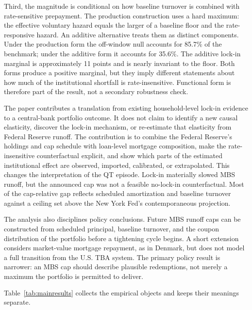 Third, the magnitude is conditional on how baseline turnover is combined with rate-sensitive prepayment. The production construction uses a hard maximum: the effective voluntary hazard equals the larger of a baseline floor and the rate-responsive hazard. An additive alternative treats them as distinct components. Under the production form the off-window null accounts for 85.7\% of the benchmark; under the additive form it accounts for 35.6\%. The additive lock-in marginal is approximately 11 points and is nearly invariant to the floor. Both forms produce a positive marginal, but they imply different statements about how much of the institutional shortfall is rate-insensitive. Functional form is therefore part of the result, not a secondary robustness check.

The paper contributes a translation from existing household-level lock-in evidence to a central-bank portfolio outcome. It does not claim to identify a new causal elasticity, discover the lock-in mechanism, or re-estimate that elasticity from Federal Reserve runoff. The contribution is to combine the Federal Reserve's holdings and cap schedule with loan-level mortgage composition, make the rate-insensitive counterfactual explicit, and show which parts of the estimated institutional effect are observed, imported, calibrated, or extrapolated. This changes the interpretation of the QT episode. Lock-in materially slowed MBS runoff, but the announced cap was not a feasible no-lock-in counterfactual. Most of the cap-relative gap reflects scheduled amortization and baseline turnover against a ceiling set above the New York Fed's contemporaneous projection.

The analysis also disciplines policy conclusions. Future MBS runoff caps can be constructed from scheduled principal, baseline turnover, and the coupon distribution of the portfolio before a tightening cycle begins. A short extension considers market-value mortgage repayment, as in Denmark, but does not model a full transition from the U.S. TBA system. The primary policy result is narrower: an MBS cap should describe plausible redemptions, not merely a maximum the portfolio is permitted to deliver.

Table~\ref{tab:mainresults} collects the empirical objects and keeps their meanings separate.

